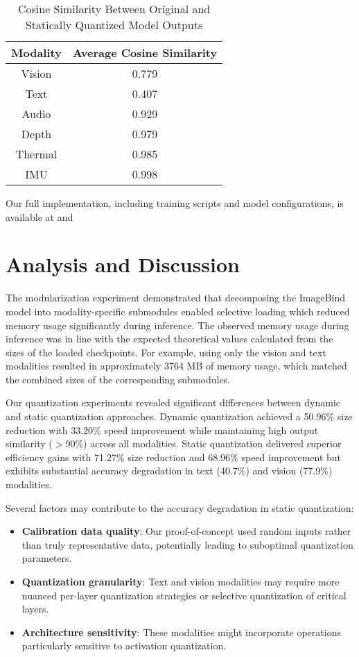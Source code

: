 \documentclass[runningheads]{IEEEtran}
\begin{document}
\begin{table}[ht]
\caption{Cosine Similarity Between Original and Statically Quantized Model Outputs}
\label{tab:static_quant_cosine}
\centering
\begin{tabular}{|c|c|}
\hline
\textbf{Modality} & \textbf{Average Cosine Similarity} \\
\hline
Vision & 0.779 \\
Text & 0.407 \\
Audio & 0.929 \\
Depth & 0.979 \\
Thermal & 0.985 \\
IMU & 0.998 \\
\hline
\end{tabular}
\end{table}


Our full implementation, including training scripts and model configurations, is available at \cite{saed2025_modular_pr} and \cite{saed2025_quantization_branch}

\section{Analysis and Discussion}

The modularization experiment demonstrated that decomposing the ImageBind model into modality-specific submodules enabled selective loading which reduced memory usage significantly during inference. The observed memory usage during inference was in line with the expected theoretical values calculated from the sizes of the loaded checkpoints. For example, using only the vision and text modalities resulted in approximately 3764 MB of memory usage, which matched the combined sizes of the corresponding submodules. 

Our quantization experiments revealed significant differences between dynamic and static quantization approaches. Dynamic quantization achieved a 50.96\% size reduction with 33.20\% speed improvement while maintaining high output similarity ($>$90\%) across all modalities. Static quantization delivered superior efficiency gains with 71.27\% size reduction and 68.96\% speed improvement but exhibits substantial accuracy degradation in text (40.7\%) and vision (77.9\%) modalities.

Several factors may contribute to the accuracy degradation in static quantization:

\begin{itemize}
    \item \textbf{Calibration data quality}: Our proof-of-concept used random inputs rather than truly representative data, potentially leading to suboptimal quantization parameters.
    \item \textbf{Quantization granularity}: Text and vision modalities may require more nuanced per-layer quantization strategies or selective quantization of critical layers.
    \item \textbf{Architecture sensitivity}: These modalities might incorporate operations particularly sensitive to activation quantization.
\end{itemize}
\end{document}
